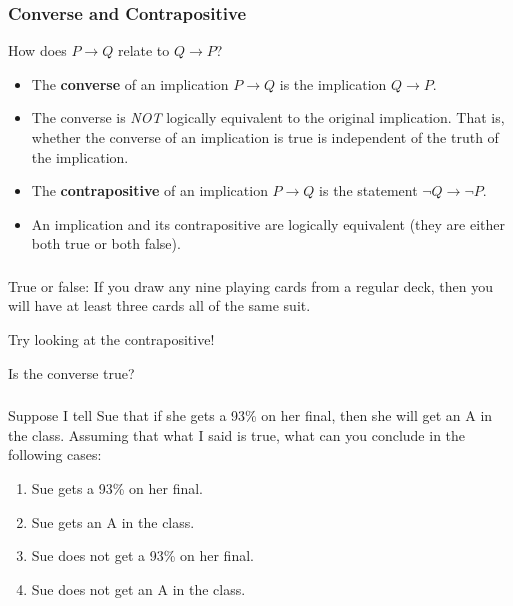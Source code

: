 \documentclass[11pt, compress]{beamer}
\newcommand{\terminology}[1]{\textbf{#1}}\newcommand{\lt}{<}
\newcommand{\imp}{\rightarrow}
\begin{document}
\begin{frame}
\frametitle{Converse and Contrapositive}
 How does \(P \imp Q\) relate to \(Q \imp P\)?
\pause 

\begin{itemize}[<+->]
\item{} The \terminology{converse}  of an implication \(P \imp Q\) is the implication \(Q \imp P\).


\item{} The converse is \emph{NOT} logically equivalent to the original implication. That is, whether the converse of an implication is true is independent of the truth of the implication.


\item{} The \terminology{contrapositive} of an implication \(P \imp Q\) is the statement \(\neg Q \imp \neg P\).


\item{} An implication and its contrapositive are logically equivalent (they are either both true or both false).

\end{itemize}

\end{frame}
 
\begin{frame}
\frametitle{}
\begin{example}[0.2.5]True or false: If you draw any nine playing cards from a regular deck, then you will have at least three cards all of the same suit.

\pause \vfill 

Try looking at the contrapositive!

\pause \vfill 

Is the converse true?
\end{example}
\end{frame}
 
\begin{frame}
\frametitle{}
\begin{example}[0.2.6]Suppose I tell Sue that if she gets a 93\% on her final, then she will get an A in the class. Assuming that what I said is true, what can you conclude in the following cases:
\begin{enumerate}
\item{} Sue gets a 93\% on her final.


\item{} Sue gets an A in the class.


\item{} Sue does not get a 93\% on her final.


\item{} Sue does not get an A in the class.

\end{enumerate}

\end{example}
\end{frame}
 
\end{document}
